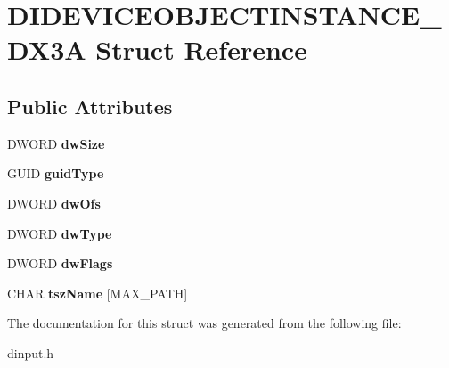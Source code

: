 \hypertarget{struct_d_i_d_e_v_i_c_e_o_b_j_e_c_t_i_n_s_t_a_n_c_e___d_x3_a}{\section{D\-I\-D\-E\-V\-I\-C\-E\-O\-B\-J\-E\-C\-T\-I\-N\-S\-T\-A\-N\-C\-E\-\_\-\-D\-X3\-A Struct Reference}
\label{struct_d_i_d_e_v_i_c_e_o_b_j_e_c_t_i_n_s_t_a_n_c_e___d_x3_a}
}
\subsection*{Public Attributes}
\begin{DoxyCompactItemize}
\item 
\hypertarget{struct_d_i_d_e_v_i_c_e_o_b_j_e_c_t_i_n_s_t_a_n_c_e___d_x3_a_ad2be79921c2a6afc2b0a4e751dcc4d19}{D\-W\-O\-R\-D {\bfseries dw\-Size}}\label{struct_d_i_d_e_v_i_c_e_o_b_j_e_c_t_i_n_s_t_a_n_c_e___d_x3_a_ad2be79921c2a6afc2b0a4e751dcc4d19}

\item 
\hypertarget{struct_d_i_d_e_v_i_c_e_o_b_j_e_c_t_i_n_s_t_a_n_c_e___d_x3_a_a44018cda7a4d2b15e39ca97ff2e19fca}{G\-U\-I\-D {\bfseries guid\-Type}}\label{struct_d_i_d_e_v_i_c_e_o_b_j_e_c_t_i_n_s_t_a_n_c_e___d_x3_a_a44018cda7a4d2b15e39ca97ff2e19fca}

\item 
\hypertarget{struct_d_i_d_e_v_i_c_e_o_b_j_e_c_t_i_n_s_t_a_n_c_e___d_x3_a_adaad5ae2233a23c80d7898522b4b03c5}{D\-W\-O\-R\-D {\bfseries dw\-Ofs}}\label{struct_d_i_d_e_v_i_c_e_o_b_j_e_c_t_i_n_s_t_a_n_c_e___d_x3_a_adaad5ae2233a23c80d7898522b4b03c5}

\item 
\hypertarget{struct_d_i_d_e_v_i_c_e_o_b_j_e_c_t_i_n_s_t_a_n_c_e___d_x3_a_a05c5bf2410970e7d6a01b9c66cb86570}{D\-W\-O\-R\-D {\bfseries dw\-Type}}\label{struct_d_i_d_e_v_i_c_e_o_b_j_e_c_t_i_n_s_t_a_n_c_e___d_x3_a_a05c5bf2410970e7d6a01b9c66cb86570}

\item 
\hypertarget{struct_d_i_d_e_v_i_c_e_o_b_j_e_c_t_i_n_s_t_a_n_c_e___d_x3_a_a2940957f14171d5807ab871b05e44d39}{D\-W\-O\-R\-D {\bfseries dw\-Flags}}\label{struct_d_i_d_e_v_i_c_e_o_b_j_e_c_t_i_n_s_t_a_n_c_e___d_x3_a_a2940957f14171d5807ab871b05e44d39}

\item 
\hypertarget{struct_d_i_d_e_v_i_c_e_o_b_j_e_c_t_i_n_s_t_a_n_c_e___d_x3_a_a8b6305835cf6467621227215d15d16c3}{C\-H\-A\-R {\bfseries tsz\-Name} \mbox{[}M\-A\-X\-\_\-\-P\-A\-T\-H\mbox{]}}\label{struct_d_i_d_e_v_i_c_e_o_b_j_e_c_t_i_n_s_t_a_n_c_e___d_x3_a_a8b6305835cf6467621227215d15d16c3}

\end{DoxyCompactItemize}


The documentation for this struct was generated from the following file\-:\begin{DoxyCompactItemize}
\item 
dinput.\-h\end{DoxyCompactItemize}
